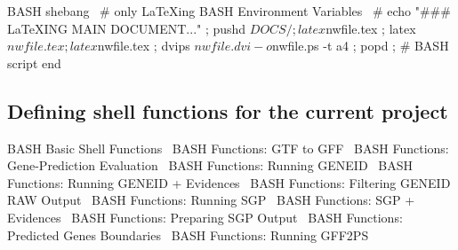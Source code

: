 \documentclass[11pt]{article}
\def\nwendcode{\endtrivlist \endgroup} %
\let\nwdocspar=\par                    %
\newcommand{\subsctn}[1]{\subsection{#1}}
\begin{document}
\nwenddocs{}\endmoddef
\LA{}BASH shebang~{\nwtagstyle{}}\RA{}
# only LaTeXing
\LA{}BASH Environment Variables~{\nwtagstyle{}}\RA{}
#
echo "### LaTeXING MAIN DOCUMENT..." ;
pushd $DOCS/ ;
latex $nwfile.tex ; 
latex $nwfile.tex ; 
latex $nwfile.tex ;
dvips $nwfile.dvi -o $nwfile.ps -t a4 ;
popd ;
#
\LA{}BASH script end~{\nwtagstyle{}}\RA{}
\nwendcode{}%

\subsctn{Defining shell functions for the current project} %

\nwenddocs{}\endmoddef
\LA{}BASH Basic Shell Functions~{\nwtagstyle{}}\RA{}
\LA{}BASH Functions: GTF to GFF~{\nwtagstyle{}}\RA{}
\LA{}BASH Functions: Gene-Prediction Evaluation~{\nwtagstyle{}}\RA{}
\LA{}BASH Functions: Running GENEID~{\nwtagstyle{}}\RA{}
\LA{}BASH Functions: Running GENEID + Evidences~{\nwtagstyle{}}\RA{}
\LA{}BASH Functions: Filtering GENEID RAW Output~{\nwtagstyle{}}\RA{}
\LA{}BASH Functions: Running SGP~{\nwtagstyle{}}\RA{}
\LA{}BASH Functions: SGP + Evidences~{\nwtagstyle{}}\RA{}
\LA{}BASH Functions: Preparing SGP Output~{\nwtagstyle{}}\RA{}
\LA{}BASH Functions: Predicted Genes Boundaries~{\nwtagstyle{}}\RA{}
\LA{}BASH Functions: Running GFF2PS~{\nwtagstyle{}}\RA{}
\nwendcode{}\nwdocspar
\end{document}
